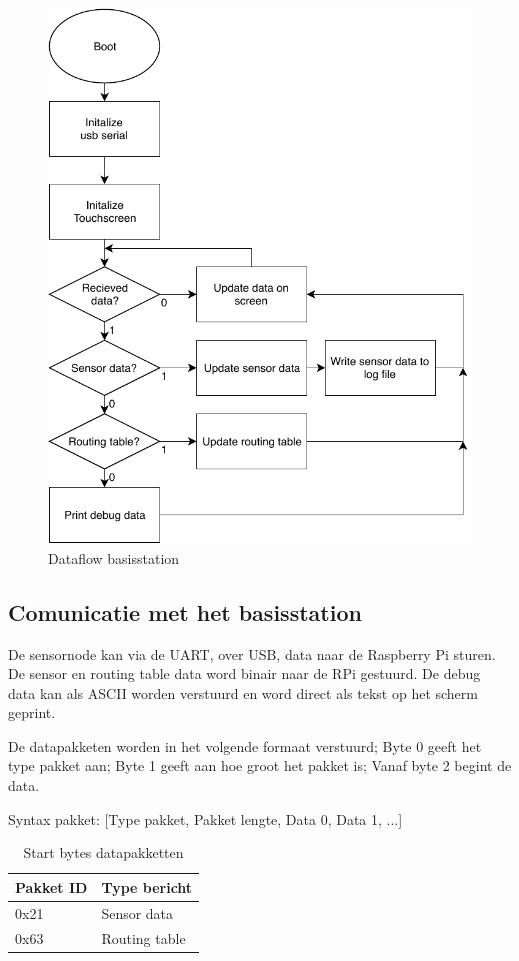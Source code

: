 \documentclass[a4paper, 11pt]{article}
\begin{document}
\begin{figure}[!ht]
\begin{center}
	\includegraphics[width=.7\textwidth, keepaspectratio]{media/basisstation_software.pdf}
    \caption{Dataflow basisstation}
    \label{fig:basisstation}
\end{center}
\end{figure}

\subsection{Comunicatie met het basisstation}
De sensornode kan via de UART, over USB, data naar de Raspberry Pi sturen. De sensor en routing table data word binair naar de RPi gestuurd. De debug data kan als ASCII worden verstuurd en word direct als tekst op het scherm geprint.

De datapakketen worden in het volgende formaat verstuurd; Byte 0 geeft het type pakket aan; Byte 1 geeft aan hoe groot het pakket is; Vanaf byte 2 begint de data.

\begin{center}
Syntax pakket: [Type pakket, Pakket lengte, Data 0, Data 1, ...]
\end{center}

\begin{table}[!h]
\centering
\begin{tabular}{|l|l|}
\hline
\rowcolor[HTML]{EFEFEF}
\textbf{Pakket ID} & \textbf{Type bericht} \\ \hline
0x21               & Sensor data           \\ \hline
0x63               & Routing table         \\ \hline
\end{tabular}
\caption{Start bytes datapakketten}
\label{tab:datapakket_pi}
\end{table}
\end{document}
